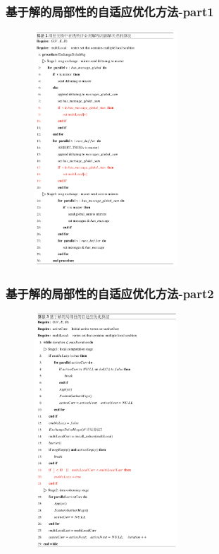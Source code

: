 \documentclass[10pt]{beamer}
\begin{document}
\begin{frame}%
  \frametitle{基于解的局部性的自适应优化方法-part1}

  \begin{figure}[H]
    \centering
    \includegraphics[width=0.48\textwidth]{Img/algo2.png}
  \end{figure}
\end{frame}


\begin{frame}%
  \frametitle{基于解的局部性的自适应优化方法-part2}
  \begin{figure}[H]
    \centering
    \includegraphics[width=0.48\textwidth]{Img/algo3.png}
  \end{figure}
\end{frame}
\end{document}
